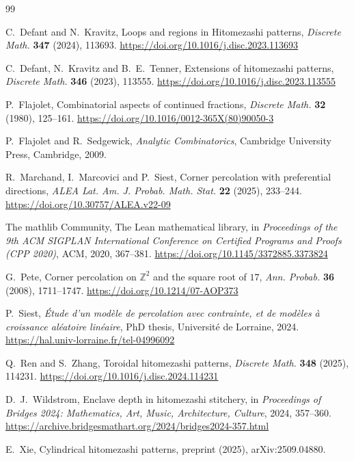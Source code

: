 \documentclass[11pt]{amsart}
\theoremstyle{definition}
\theoremstyle{remark}
\begin{document}
\begin{thebibliography}{99}

 C.~Defant and N.~Kravitz, Loops and regions in Hitomezashi patterns,
\emph{Discrete Math.} \textbf{347} (2024), 113693. \url{https://doi.org/10.1016/j.disc.2023.113693}

 C.~Defant, N.~Kravitz and B.~E.~Tenner, Extensions of hitomezashi patterns,
\emph{Discrete Math.} \textbf{346} (2023), 113555. \url{https://doi.org/10.1016/j.disc.2023.113555}

 P.~Flajolet, Combinatorial aspects of continued fractions, \emph{Discrete Math.}
\textbf{32} (1980), 125--161. \url{https://doi.org/10.1016/0012-365X(80)90050-3}

 P.~Flajolet and R.~Sedgewick, \emph{Analytic Combinatorics}, Cambridge University Press,
Cambridge, 2009.

 R.~Marchand, I.~Marcovici and P.~Siest, Corner percolation with preferential directions,
\emph{ALEA Lat. Am. J. Probab. Math. Stat.} \textbf{22} (2025), 233--244.
\url{https://doi.org/10.30757/ALEA.v22-09}

 The mathlib Community, The Lean mathematical library, in \emph{Proceedings of the 9th
ACM SIGPLAN International Conference on Certified Programs and Proofs (CPP 2020)}, ACM, 2020, 367--381.
\url{https://doi.org/10.1145/3372885.3373824}

 G.~Pete, Corner percolation on $\mathbb Z^2$ and the square root of $17$, \emph{Ann.
Probab.} \textbf{36} (2008), 1711--1747. \url{https://doi.org/10.1214/07-AOP373}

 P.~Siest, \emph{\'Etude d'un mod\`ele de percolation avec contrainte, et de mod\`eles
\`a croissance al\'eatoire lin\'eaire}, PhD thesis, Universit\'e de Lorraine, 2024.
\url{https://hal.univ-lorraine.fr/tel-04996092}

 Q.~Ren and S.~Zhang, Toroidal hitomezashi patterns, \emph{Discrete Math.} \textbf{348}
(2025), 114231. \url{https://doi.org/10.1016/j.disc.2024.114231}

 D.~J.~Wildstrom, Enclave depth in hitomezashi stitchery, in \emph{Proceedings of Bridges
2024: Mathematics, Art, Music, Architecture, Culture}, 2024, 357--360.
\url{https://archive.bridgesmathart.org/2024/bridges2024-357.html}

 E.~Xie, Cylindrical hitomezashi patterns, preprint (2025), arXiv:2509.04880.

\end{thebibliography}
\end{document}
